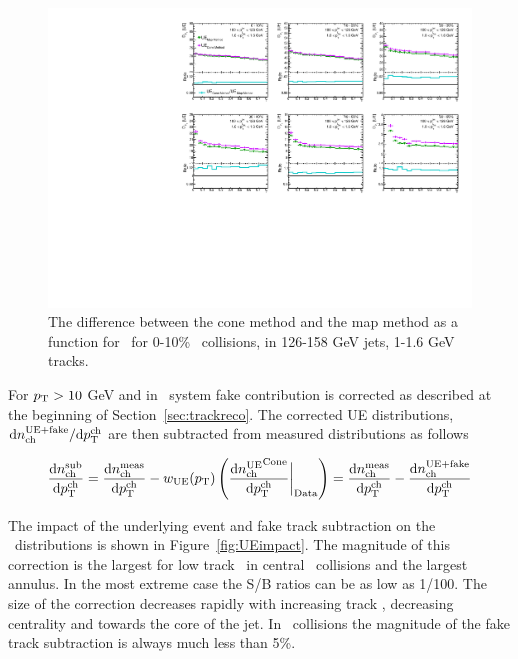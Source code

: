 \begin{figure}
\centering
\includegraphics[page=2,width=1.\textwidth]{figures/main/UE/UE_x_ratio_c0}
\caption{The difference between the cone method and the map method as a function for \rvar\ for 0-10\% \pbpb\ collisions, in 126-158 GeV jets, 1-1.6 GeV tracks.}
\label{fig:conemethod_mapmethod}
\end{figure}


For $\mbox{$p_{\mathrm{T}}$} > 10$ GeV and in  \pp\ system fake contribution is corrected as described at the beginning of Section~\ref{sec:trackreco}.
The corrected UE distributions, $\mathrm{d} \mbox{$n_{\mathrm{ch}}^{\mathrm{UE+fake}}$} / \mathrm{d} \mbox{$p_{{\mathrm{T}}}^{\mathrm{ch}}$}$ are then subtracted from measured distributions as follows

\begin{eqnarray}
\frac{\mathrm{d} n_{\mathrm{ch}}^{\mathrm{sub}}}{\mathrm{d} \mbox{$p_{{\mathrm{T}}}^{\mathrm{ch}}$}}  = \frac{\mathrm{d} n_{\mathrm{ch}}^{\mathrm{meas}}}{\mathrm{d} \mbox{$p_{{\mathrm{T}}}^{\mathrm{ch}}$}} - {w_{\mathrm{UE}} (\mbox{$p_{\mathrm{T}}$})} \left( \frac{\mathrm{d} \mbox{$n_{\mathrm{ch}}^{\mathrm{UE}}$}^{\mathrm{Cone}}}{\mathrm{d} \mbox{$p_{{\mathrm{T}}}^{\mathrm{ch}}$}} \bigg|_{\mathrm{Data}} \right)  = \frac{\mathrm{d} n_{\mathrm{ch}}^{\mathrm{meas}}}{\mathrm{d} \mbox{$p_{{\mathrm{T}}}^{\mathrm{ch}}$}} - \frac{\mathrm{d} \mbox{$n_{\mathrm{ch}}^{\mathrm{UE+fake}}$}}{\mathrm{d} \mbox{$p_{{\mathrm{T}}}^{\mathrm{ch}}$}}
\end{eqnarray}


The impact of the underlying event and fake track subtraction on the \Dptr\ distributions is shown in Figure~\ref{fig:UEimpact}.
The magnitude of this correction is the largest for low track \pt\ in central \pbpb\ collisions and the largest annulus.
In the most extreme case the S/B ratios can be as low as 1/100.
The size of the correction decreases rapidly with increasing track \pt, decreasing centrality and towards the core of the jet.
In \pp\ collisions the magnitude of the fake track subtraction is always much less than 5\%.

